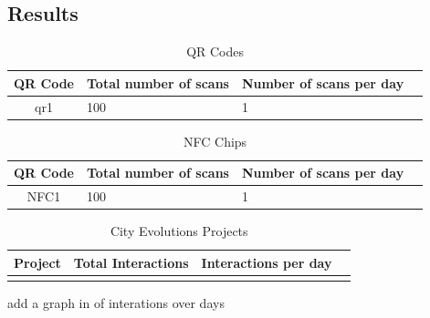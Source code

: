 \documentclass[a4,12pt]{article}
\begin{document}
\subsection{Results}
\begin{table}[h!]
    \begin{center}
        \leavevmode
        \begin{tabular}{|cll|l|}\hline
            QR Code & Total number of scans & Number of scans per day\\[0.1cm]\hline
            qr1 & 100 & 1\\\hline
        \end{tabular}
    \end{center}
    \caption{QR Codes}
    \label{table:qrcodes}
\end{table}

\begin{table}[h!]
    \begin{center}
    \leavevmode 
    \small
    \begin{tabular}{|cll|l|}\hline
        QR Code & Total number of scans & Number of scans per day\\[0.1cm]\hline
        NFC1 & 100 & 1\\\hline
    \end{tabular}
    \end{center}
    \caption{NFC Chips}
    \label{table:nfcchips}
\end{table}

\begin{table}[h!]
    \begin{center}
    \leavevmode
    \begin{tabular}{|cll|l|}\hline
        Project & Total Interactions & Interactions per day\\[0.1cm]\hline
        \\\hline
    \end{tabular}
    \end{center}
    \caption{City Evolutions Projects}
    \label{table:cityEvolutionsProjects}
\end{table}

add a graph in of interations over days
\end{document}
